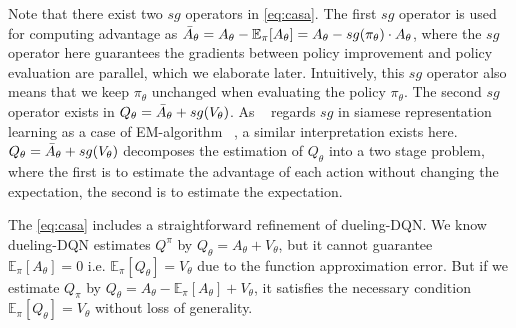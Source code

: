 Note that there exist two $sg$ operators in \eqref{eq:casa}.
The first $sg$ operator is used for computing advantage as $\Bar{A}_\theta = A_\theta - \mathbb{E}_\pi [A_\theta] = A_\theta - sg(\pi_\theta) \cdot A_\theta$,
where the $sg$ operator here guarantees the gradients between policy improvement and policy evaluation are parallel, which we elaborate later.
Intuitively, this $sg$ operator also means that we keep $\pi_\theta$ unchanged when evaluating the policy $\pi_\theta$.
The second $sg$ operator exists in $Q_\theta = \Bar{A}_\theta + sg(V_\theta)$.
As ~\citep{simsiam} regards $sg$ in siamese representation learning as a case of EM-algorithm ~\citep{em}, a similar interpretation exists here.
$Q_\theta = \Bar{A}_\theta + sg(V_\theta)$ decomposes the estimation of $Q_\theta$ into a two stage problem, where the first is to estimate the advantage of each action without changing the expectation, the second is to estimate the expectation.

The \eqref{eq:casa} includes a straightforward refinement of dueling-DQN.
{ We know dueling-DQN estimates $Q^\pi$ by $Q_\theta =  A_\theta + V_\theta$, but it cannot guarantee $\mathbb{E}_\pi[A_\theta] = 0$ i.e. $\mathbb{E}_\pi [Q_\theta] = V_\theta$ due to the function approximation error. 
But if we estimate $Q_\pi$ by $Q_\theta =  A_\theta - \mathbb{E}_\pi[A_\theta] + V_\theta$, it satisfies the necessary condition $\mathbb{E}_\pi [Q_\theta] = V_\theta$ without loss of generality.}

